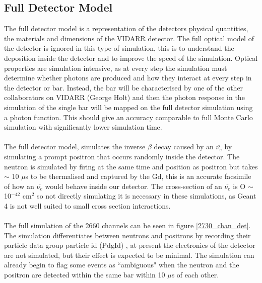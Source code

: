 \documentclass[12pt,a4paper]{article}
\begin{document}
\subsection{Full Detector Model}
The full detector model is a representation of the detectors physical quantities, the materials and dimensions of the VIDARR detector. The full optical model of the detector is ignored in this type of simulation, this is to understand the deposition inside the detector and to improve the speed of the simulation. Optical properties are simulation intensive, as at every step the simulation must determine whether photons are produced and how they interact at every step in the detector or bar. Instead, the bar will be characterised by one of the other collaborators on VIDARR (George Holt) and then the photon response in the simulation of the single bar will be mapped on the full detector simulation using a photon function. This should give an accuracy comparable to full Monte Carlo simulation with significantly lower simulation time.
\\\\The full detector model, simulates the inverse $\beta$ decay caused by an $\overline{\nu_{e}}$ by simulating a prompt positron that occurs randomly inside the detector. The neutron is simulated by firing at the same time and position as positron but takes $\sim$ 10 $\mu$s to be thermalised and captured by the Gd, this is an accurate facsimile of how an $\overline{\nu_{e}}$ would behave inside our detector. The cross-section of an $\overline{\nu_{e}}$ is O $\sim$ 10$^{-42}$ cm$^2$ \cite{vogel_beacom_nu_cross} so not directly simulating it is necessary in these simulations, as Geant 4 is not well suited to small cross section interactions.
\\\\ The full simulation of the 2660 channels can be seen in figure \ref{2730_chan_det}. The simulation differentiates between neutrons and positrons by recording their particle data group particle id (PdgId) \cite{pdg_paper}, at present the electronics of the detector are not simulated, but their effect is expected to be minimal. The simulation can already begin to flag some events as ``ambiguous" when the neutron and the positron are detected within the same bar within 10 $\mu$s of each other.\\\\
\end{document}
